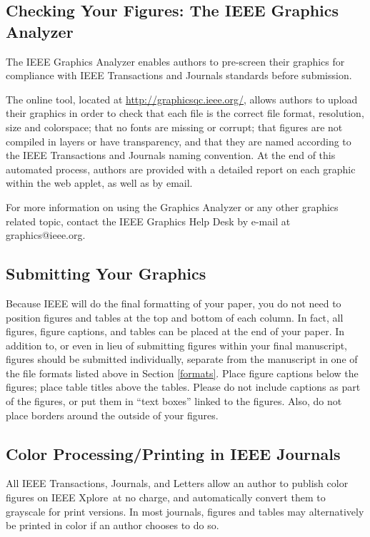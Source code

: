 \documentclass[journal,twoside,web]{ieeecolor2}
\begin{document}
\subsection{Checking Your Figures: The IEEE Graphics Analyzer}
The IEEE Graphics Analyzer enables authors to pre-screen their graphics for 
compliance with IEEE Transactions and Journals standards before submission.

The online tool, located at
\underline{http://graphicsqc.ieee.org/}, allows authors to 
upload their graphics in order to check that each file is the correct file 
format, resolution, size and colorspace; that no fonts are missing or 
corrupt; that figures are not compiled in layers or have transparency, and 
that they are named according to the IEEE Transactions and Journals naming 
convention.
At the end of this automated process, authors are provided with 
a detailed report on each graphic within the web applet, as well as by 
email.

For more information on using the Graphics Analyzer or any other graphics 
related topic, contact the IEEE Graphics Help Desk by e-mail at 
graphics@ieee.org.

\subsection{Submitting Your Graphics}
Because IEEE will do the final formatting of your paper,
you do not need to position figures and tables at the top and bottom of each 
column.
In fact, all figures, figure captions, and tables can be placed at 
the end of your paper.
In addition to, or even in lieu of submitting figures 
within your final manuscript, figures should be submitted individually, 
separate from the manuscript in one of the file formats listed above in 
Section \ref{formats}.
Place figure captions below the figures; place table titles 
above the tables.
Please do not include captions as part of the figures, or 
put them in ``text boxes'' linked to the figures.
Also, do not place borders 
around the outside of your figures.

\subsection{Color Processing/Printing in IEEE Journals}
All IEEE Transactions, Journals, and Letters allow an author to publish 
color figures on IEEE Xplore\textregistered\ at no charge, and automatically 
convert them to grayscale for print versions.
In most journals, figures and 
tables may alternatively be printed in color if an author chooses to do so.
\end{document}
